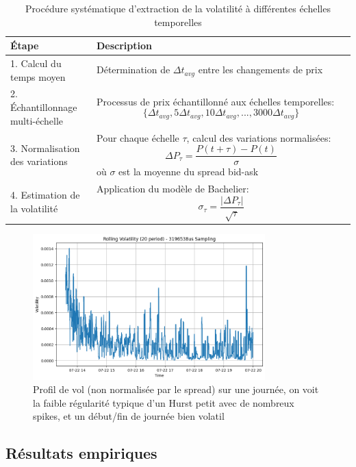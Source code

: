 \documentclass[10pt,a4paper]{article}
\theoremstyle{definition}
\theoremstyle{remark}
\begin{document}
\begin{itemize}
\begin{landscape}
\begin{table}[h!]
\centering
\begin{tabular}{|p{0.25\linewidth}|p{0.75\linewidth}|}
\hline
\textbf{Étape} & \textbf{Description} \\
\hline
1. Calcul du temps moyen & Détermination de \(\Delta t_{avg}\) entre les changements de prix \\
\hline
2. Échantillonnage multi-échelle & Processus de prix échantillonné aux échelles temporelles: \[\{\Delta t_{avg}, 5\Delta t_{avg}, 10\Delta t_{avg}, ..., 3000\Delta t_{avg}\}\] \\
\hline
3. Normalisation des variations & Pour chaque échelle \(\tau\), calcul des variations normalisées: \[\Delta P_{\tau} = \frac{P(t+\tau) - P(t)}{\sigma}\] où \(\sigma\) est la moyenne du spread bid-ask \\
\hline
4. Estimation de la volatilité & Application du modèle de Bachelier: \[\sigma_{\tau} = \frac{|\Delta P_{\tau}|}{\sqrt{\tau}}\] \\
\hline
\end{tabular}
\caption{Procédure systématique d'extraction de la volatilité à différentes échelles temporelles}
\label{tab:volatility_extraction}
\end{table}
\end{landscape}


\begin{figure}[H]
    \centering
    \includegraphics[width=0.8\textwidth]{rollingvola.png}
    \caption{Profil de vol (non normalisée par le spread) sur une journée, on voit la faible régularité typique d'un Hurst petit avec de nombreux spikes, et un début/fin de journée bien volatil}
    \label{fig:jump_example_1}
\end{figure}

\subsection{Résultats empiriques}


\end{itemize}
\end{document}
